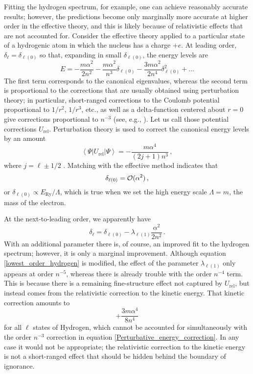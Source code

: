 \documentclass[pra,twocolumn,nofootinbib, superscriptaddress]{revtex4}%
\def\({\left(}
\def\){\right)}
\def\a{\alpha}
\def\f#1#2{\frac{#1}{#2}}
\def\de{\delta}
\def\l{\lambda}
\def\L{\Lambda}
\newcommand{\ket}[1]{\left| #1 \right>} %
\newcommand{\bra}[1]{\left< #1 \right|} %
\begin{document}
Fitting the hydrogen spectrum, for example, one can achieve reasonably accurate results; however, the predictions become only marginally more accurate at higher order in the effective theory, and this is likely because of relativistic effects that are not accounted for. Consider the effective theory applied to a particular state of a hydrogenic atom in which the nucleus has a charge $+e$. At leading order, $\de_\ell = \de_{\ell(0)}$ so that, expanding in small $\de_{\ell(0)}$, the energy levels are
\begin{equation}\label{lowest_order_hydrogen}
E=-\f{m\a^2}{2n^2} -\f{m\a^2}{n^3}\de_{\ell(0)} 
 -\f{3m\a^2}{2n^4}\de_{\ell(0)}^2  + \dots
\end{equation}
The first term corresponds to the canonical eigenvalues, whereas the second term is proportional to the corrections that are usually obtained using perturbation theory; in particular, short-ranged corrections to the Coulomb potential proportional to $1/r^2$, $1/r^3$, etc., as well as a delta-function centered about $r=0$ give corrections proportional to $n^{-3}$  (see, e.g., \cite{PhysRevA.42.1123}). Let us call those potential corrections $U_\text{rel}$.  Perturbation theory is used to correct the canonical energy levels by an amount 
\begin{equation}\label{Perturbative_energy_correction}
\bra{\Psi} U_\text{rel}\ket{\Psi} = - \f{m\a^4}{\(2j+1\)n^3}\,, 
\end{equation}
where $j=\ell\pm1/2$ \cite{berestetskii1982quantum}. Matching with the effective method indicates that
\begin{equation}
\de_{\ell(0)} = {\cal O}(\a^2)\,,
\end{equation}
or $\de_{\ell(0)} \propto E_\text{Ry}/\L$, which is true when we set the high energy scale $\L=m$, the mass of the electron.

At the next-to-leading order, we apparently have
\begin{equation}
\de_\ell = \de_{\ell(0)}-\l_{\ell(1)}\f{\a^2}{2n^2}\,.
\end{equation}
With an additional parameter there is, of course, an improved fit to the hydrogen spectrum; however, it is only a marginal improvement. Although equation \eqref{lowest_order_hydrogen} is modified, the effect of the parameter $\l_{\ell(1)}$ only appears at order $n^{-5}$, whereas there is already trouble with the order $n^{-4}$ term. This is because there is a remaining fine-structure effect not captured by $U_\text{rel}$, but instead comes from the relativistic correction to the kinetic energy. That kinetic correction amounts to
\begin{equation}
+\f{3m\a^4}{8n^4}
\end{equation}
for all $\ell$ states of Hydrogen, which cannot be accounted for simultaneously with the order $n^{-3}$ correction in equation \eqref{Perturbative_energy_correction}. In any case it would not be appropriate;  the relativistic correction to the kinetic energy is not a short-ranged effect that should be hidden behind the boundary of ignorance. 
\end{document}
